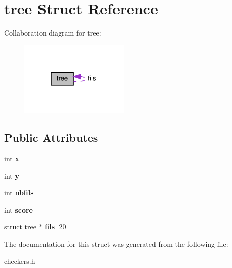 \hypertarget{structtree}{}\section{tree Struct Reference}
\label{structtree}


Collaboration diagram for tree\+:\nopagebreak
\begin{figure}[H]
\begin{center}
\leavevmode
\includegraphics[width=147pt]{structtree__coll__graph}
\end{center}
\end{figure}
\subsection*{Public Attributes}
\begin{DoxyCompactItemize}
\item 
\mbox{\label{structtree_adc025a79b084631c7cb73e195fef1b0e}} 
int {\bfseries x}
\item 
\mbox{\label{structtree_a1703e04257facd6c26ec7a0b2d70e20b}} 
int {\bfseries y}
\item 
\mbox{\label{structtree_acc1638e62e8bb9c8e641625d6cd08a64}} 
int {\bfseries nbfils}
\item 
\mbox{\label{structtree_ac7510e2957091159e3697437d7a7d283}} 
int {\bfseries score}
\item 
\mbox{\label{structtree_a74a64c65df6fd5c2df44cf47c83ba6d6}} 
struct \hyperlink{structtree}{tree} $\ast$ {\bfseries fils} \mbox{[}20\mbox{]}
\end{DoxyCompactItemize}


The documentation for this struct was generated from the following file\+:\begin{DoxyCompactItemize}
\item 
checkers.\+h\end{DoxyCompactItemize}
